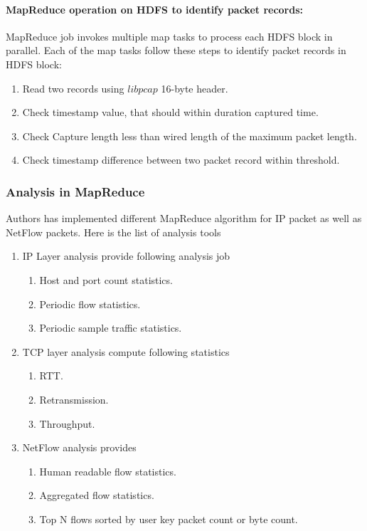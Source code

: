       \paragraph{MapReduce operation on HDFS to identify packet records:}
	MapReduce job invokes multiple map tasks to process each HDFS block in parallel. Each of the map tasks follow these steps to
	identify packet records in HDFS block:
	\begin{enumerate}
	 \item Read two records using $libpcap$ 16-byte header.
	 \item Check timestamp value, that should within duration captured time.
	 \item Check Capture length less than  wired length of the maximum packet length.
	 \item Check timestamp difference between two packet record within threshold. 
	\end{enumerate}
	
	\subsubsection{Analysis in MapReduce}
	Authors has implemented different MapReduce algorithm for IP packet as well as NetFlow packets.
	Here is the list of analysis tools
	\begin{enumerate}
	 \item IP Layer analysis provide following analysis job
	      \begin{enumerate}
	       \item Host and port count statistics.
	       \item Periodic flow statistics.
	       \item Periodic sample traffic statistics.
	      \end{enumerate}
	 \item TCP layer analysis compute following statistics
	       \begin{enumerate}
	        \item RTT.
	        \item Retransmission.
	        \item Throughput.
	       \end{enumerate}
	\item NetFlow analysis provides 
	      \begin{enumerate}
	       \item Human readable flow statistics.
	       \item Aggregated flow statistics.
	       \item Top N flows sorted by user key packet count or byte count. 
	      \end{enumerate}

	\end{enumerate}

